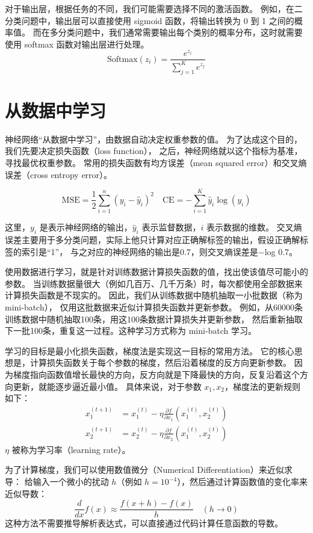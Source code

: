 对于输出层，根据任务的不同，我们可能需要选择不同的激活函数。
例如，在二分类问题中，输出层可以直接使用 sigmoid 函数，将输出转换为 0 到 1 之间的概率值。
而在多分类问题中，我们通常需要输出每个类别的概率分布，这时就需要使用 softmax 函数对输出层进行处理。
\begin{equation*}
	\text{Softmax}(z_i) = \frac{e^{z_i}}{\sum_{j=1}^K e^{z_j}}
\end{equation*}

\section{从数据中学习}
神经网络“从数据中学习”，由数据自动决定权重参数的值。
为了达成这个目的，我们先要决定损失函数（loss function），
之后，神经网络就以这个指标为基准，寻找最优权重参数。
常用的损失函数有均方误差（mean squared error）和交叉熵误差（cross entropy error）。

\begin{equation*}
	\text{MSE}  = \frac{1}{2} \sum_{i=1}^n (y_i - \hat{y}_i)^2 \quad
	\text{CE}   = - \sum_{i=1}^K \hat{y}_i \log(y_i)
\end{equation*}

这里，$y_i$ 是表示神经网络的输出，$\hat{y}_i$ 表示监督数据，$i$ 表示数据的维数。
交叉熵误差主要用于多分类问题，实际上他只计算对应正确解标签的输出，假设正确解标签的索引是“1”，
与之对应的神经网络的输出是0.7，则交叉熵误差是−log 0.7。

使用数据进行学习，就是针对训练数据计算损失函数的值，找出使该值尽可能小的参数。
当训练数据量很大（例如几百万、几千万条）时，每次都使用全部数据来计算损失函数是不现实的。
因此，我们从训练数据中随机抽取一小批数据（称为 mini-batch），
仅用这批数据来近似计算损失函数并更新参数。
例如，从60000条训练数据中随机抽取100条，用这100条数据计算损失并更新参数，
然后重新抽取下一批100条，重复这一过程。这种学习方式称为 mini-batch 学习。

学习的目标是最小化损失函数，梯度法是实现这一目标的常用方法。
它的核心思想是，计算损失函数关于每个参数的梯度，然后沿着梯度的反方向更新参数。
因为梯度指向函数值增长最快的方向，反方向就是下降最快的方向，反复沿着这个方向更新，就能逐步逼近最小值。
具体来说，对于参数 $x_1, x_2$，梯度法的更新规则如下：
\begin{align*}
	x_1^{(t+1)} & = x_1^{(t)} - \eta \frac{\partial f}{\partial x_1}(x_1^{(t)}, x_2^{(t)}) \\
	x_2^{(t+1)} & = x_2^{(t)} - \eta \frac{\partial f}{\partial x_2}(x_1^{(t)}, x_2^{(t)})
\end{align*}
$\eta$ 被称为学习率（learning rate）。

为了计算梯度，我们可以使用数值微分（Numerical Differentiation）来近似求导：
给输入一个微小的扰动 $h$（例如 $h = 10^{-4}$），然后通过计算函数值的变化率来近似导数：
\begin{equation*}
	\frac{d}{dx} f(x) \approx \frac{f(x + h) - f(x)}{h} \quad (h \to 0)
\end{equation*}
这种方法不需要推导解析表达式，可以直接通过代码计算任意函数的导数。
